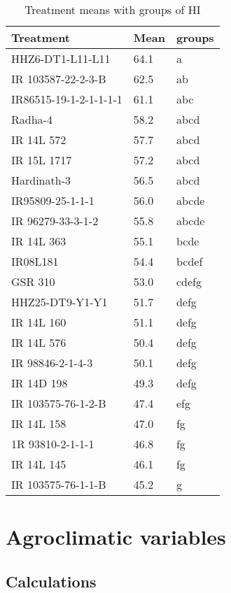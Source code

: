 \documentclass[]{article}
\begin{document}
\begin{longtable}{lll}
\caption{\label{tab:two-fac-groups-tab2}Treatment means with groups of HI}\\
\toprule
Treatment & Mean & groups\\
\midrule
\rowcolor{gray!6}  HHZ6-DT1-L11-L11 & 64.1 & a\\
IR 103587-22-2-3-B & 62.5 & ab\\
\rowcolor{gray!6}  IR86515-19-1-2-1-1-1-1 & 61.1 & abc\\
Radha-4 & 58.2 & abcd\\
\rowcolor{gray!6}  IR 14L 572 & 57.7 & abcd\\
\addlinespace
IR 15L 1717 & 57.2 & abcd\\
\rowcolor{gray!6}  Hardinath-3 & 56.5 & abcd\\
IR95809-25-1-1-1 & 56.0 & abcde\\
\rowcolor{gray!6}  IR 96279-33-3-1-2 & 55.8 & abcde\\
IR 14L 363 & 55.1 & bcde\\
\addlinespace
\rowcolor{gray!6}  IR08L181 & 54.4 & bcdef\\
GSR 310 & 53.0 & cdefg\\
\rowcolor{gray!6}  HHZ25-DT9-Y1-Y1 & 51.7 & defg\\
IR 14L 160 & 51.1 & defg\\
\rowcolor{gray!6}  IR 14L 576 & 50.4 & defg\\
\addlinespace
IR 98846-2-1-4-3 & 50.1 & defg\\
\rowcolor{gray!6}  IR 14D 198 & 49.3 & defg\\
IR 103575-76-1-2-B & 47.4 & efg\\
\rowcolor{gray!6}  IR 14L 158 & 47.0 & fg\\
1R 93810-2-1-1-1 & 46.8 & fg\\
\addlinespace
\rowcolor{gray!6}  IR 14L 145 & 46.1 & fg\\
IR 103575-76-1-1-B & 45.2 & g\\
\bottomrule
\end{longtable}
\endgroup{}

\section{Agroclimatic variables}\label{agroclimatic-variables}

\subsection{Calculations}\label{calculations}
\end{document}
